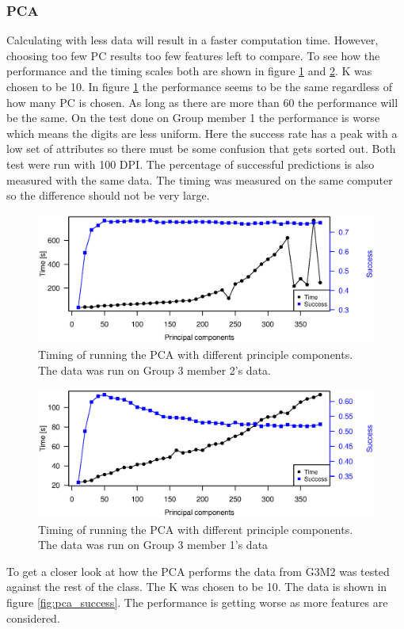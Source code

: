 \subsubsection{PCA}

Calculating with less data will result in a faster computation time.
However, choosing too few PC results too few features left to compare.
To see how the performance and the timing scales both are shown in figure \ref{fig:pca_timing_lukas} and \ref{fig:pca_timing_nikolaj}. K was chosen to be 10.
In figure \ref{fig:pca_timing_lukas} the performance seems to be the same regardless of how many PC is chosen. As long as there are more than 60 the performance will be the same.
On the test done on Group member 1 the performance is worse which means the digits are less uniform. 
Here the success rate has a peak with a low set of attributes so there must be some confusion that gets sorted out. 
Both test were run with 100 DPI. The percentage of successful predictions is also measured with the same data.
The timing was measured on the same computer so the difference should not be very large. 

\begin{figure}[H]
\centering
\includegraphics[width =0.8 \textwidth]{graphics/pca_timing}
\caption[Timing of PCA]{Timing of running the PCA with different principle components. 
The data was run on Group 3 member 2's data. 
}
\label{fig:pca_timing_lukas}
\end{figure}
\begin{figure}[H]
\centering
\includegraphics[width =0.8 \textwidth]{graphics/pca_timing_nikolaj}
\caption[Timing of PCA]{Timing of running the PCA with different principle components. 
The data was run on Group 3 member 1's data}
\label{fig:pca_timing_nikolaj}
\end{figure}

To get a closer look at how the PCA performs the data from G3M2 was tested against the rest of the class. 
The K was chosen to be 10. 
The data is shown in figure \ref{fig:pca_success}.
The performance is getting worse as more features are considered.
